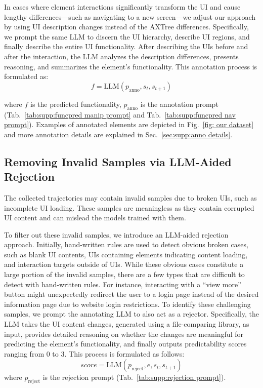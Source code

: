 In cases where element interactions significantly transform the UI and cause lengthy differences—such as navigating to a new screen—we adjust our approach by using UI description changes instead of the AXTree differences. Specifically, we prompt the same LLM to discern the UI hierarchy, describe UI regions, and finally describe the entire UI functionality. After describing the UIs before and after the interaction, the LLM analyzes the description differences, presents reasoning, and summarizes the element's functionality. This annotation process is formulated as:
\begin{equation}
    f = \text{LLM}(p_{\text{anno}}, s_t, s_{t+1})
\end{equation}

where $f$ is the predicted functionality, $p_{\text{anno}}$ is the annotation prompt (Tab.~\ref{tab:supp:funcpred manip prompt} and Tab.~\ref{tab:supp:funcpred nav prompt}). Examples of annotated elements are depicted in Fig.~\ref{fig: our dataset} and more annotation details are explained in Sec.~\ref{sec:supp:anno details}.

\subsection{Removing Invalid Samples via LLM-Aided Rejection}
The collected trajectories may contain invalid samples due to broken UIs, such as incomplete UI loading. These samples are meaningless as they contain corrupted UI content and can mislead the models trained with them.

To filter out these invalid samples, we introduce an LLM-aided rejection approach. Initially, hand-written rules are used to detect obvious broken cases, such as blank UI contents, UIs containing elements indicating content loading, and interaction targets outside of UIs. While these obvious cases constitute a large portion of the invalid samples, there are a few types that are difficult to detect with hand-written rules. For instance, interacting with a “view more” button might unexpectedly redirect the user to a login page instead of the desired information page due to website login restrictions. To identify these challenging samples, we prompt the annotating LLM to also act as a rejector. Specifically, the LLM takes the UI content changes, generated using a file-comparing library, as input, provides detailed reasoning on whether the changes are meaningful for predicting the element's functionality, and finally outputs predictability scores ranging from 0 to 3. This process is formulated as follows:
\begin{equation}
 score = \text{LLM}(p_{\text{reject}}, e, s_t, s_{t+1})
\end{equation}
where $p_{\text{reject}}$ is the rejection prompt (Tab.~\ref{tab:supp:rejection prompt}).

